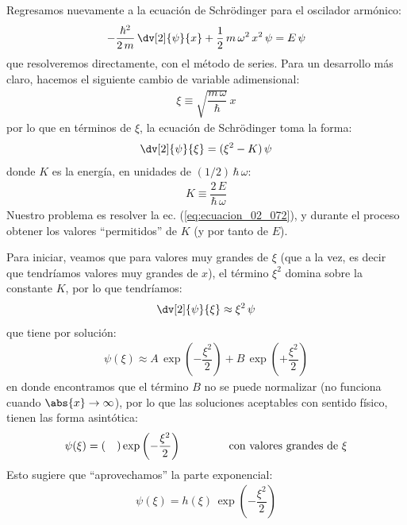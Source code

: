 Regresamos nuevamente a la ecuación de Schrödinger para el oscilador armónico:
\begin{align}
- \dfrac{\hbar^{2}}{2 \, m} \, \dv[2]{\psi}{x} + \dfrac{1}{2} \, m \, \omega^{2} \, x^{2} \, \psi = E \, \psi
\label{eq:ecuacion_02_070}
\end{align}
que resolveremos directamente, con el método de series. Para un desarrollo más claro, hacemos el siguiente cambio de variable adimensional:
\begin{align}
\xi \equiv \sqrt{ \dfrac{m \, \omega}{\hbar}} \, x
\label{eq:ecuacion_02_071}
\end{align}
por lo que en términos de $\xi$, la ecuación de Schrödinger toma la forma:
\begin{align}
\dv[2]{\psi}{\xi} = (\xi^{2} - K) \, \psi
\label{eq:ecuacion_02_072}
\end{align}
donde $K$ es la energía, en unidades de $(1/2) \, \hbar \, \omega$:
\begin{align}
K \equiv \dfrac{2 \, E}{\hbar \, \omega}
\label{eq:ecuacion_02_073}
\end{align}
Nuestro problema es resolver la ec. (\ref{eq:ecuacion_02_072}), y durante el proceso obtener los valores \enquote{permitidos} de $K$ (y por tanto de $E$).
\par
Para iniciar, veamos que para valores muy grandes de $\xi$ (que a la vez, es decir que tendríamos valores muy grandes de $x$), el término $\xi^{2}$ domina sobre la constante $K$, por lo que tendríamos:
\begin{align}
\dv[2]{\psi}{\xi} \approx \xi^{2} \, \psi
\label{eq:ecuacion_02_074}
\end{align}
que tiene por solución:
\begin{align}
\psi (\xi) \approx A \, \exp \left( - \dfrac{\xi^{2}}{2} \right) + B \, \exp \left( + \dfrac{\xi^{2}}{2} \right)
\label{eq:ecuacion_02_075}
\end{align}
en donde encontramos que el término $B$ no se puede normalizar (no funciona cuando $\abs{x} \to \infty$), por lo que las soluciones aceptables con sentido físico, tienen las forma asintótica:
\begin{align}
\psi (\xi) = ( \quad ) \exp \left( - \dfrac{\xi^{2}}{2} \right) \hspace{1.5cm} \text{con valores grandes de } \xi
\label{eq:ecuacion_02_076}
\end{align}
Esto sugiere que \enquote{aprovechamos} la parte exponencial:
\begin{align}
\psi (\xi) = h (\xi) \, \exp \left( - \dfrac{\xi^{2}}{2} \right)
\label{eq:ecuacion_02_077}
\end{align}
